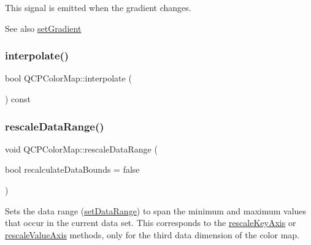 This signal is emitted when the gradient changes.

\begin{DoxySeeAlso}{See also}
\mbox{\hyperlink{class_q_c_p_color_map_a7313c78360471cead3576341a2c50377}{set\+Gradient}} 
\end{DoxySeeAlso}
\mbox{\label{class_q_c_p_color_map_a15d1877883fa463d44bfcbfd6840d4ca}} 
\subsubsection{\texorpdfstring{interpolate()}{interpolate()}}
{\footnotesize\ttfamily bool Q\+C\+P\+Color\+Map\+::interpolate (\begin{DoxyParamCaption}{ }\end{DoxyParamCaption}) const\hspace{0.3cm}{\ttfamily [inline]}}

\mbox{\label{class_q_c_p_color_map_a856608fa3dd1cc290bcd5f29a5575774}} 
\subsubsection{\texorpdfstring{rescaleDataRange()}{rescaleDataRange()}}
{\footnotesize\ttfamily void Q\+C\+P\+Color\+Map\+::rescale\+Data\+Range (\begin{DoxyParamCaption}\item[{bool}]{recalculate\+Data\+Bounds = {\ttfamily false} }\end{DoxyParamCaption})}

Sets the data range (\mbox{\hyperlink{class_q_c_p_color_map_a980b42837821159786a85b4b7dcb8774}{set\+Data\+Range}}) to span the minimum and maximum values that occur in the current data set. This corresponds to the \mbox{\hyperlink{class_q_c_p_abstract_plottable_ae96b83c961e257da116c6acf9c7da308}{rescale\+Key\+Axis}} or \mbox{\hyperlink{class_q_c_p_abstract_plottable_a714eaf36b12434cd71846215504db82e}{rescale\+Value\+Axis}} methods, only for the third data dimension of the color map.

